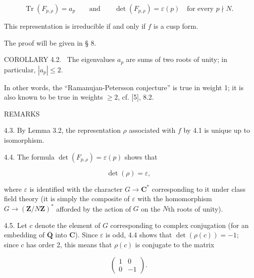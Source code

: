 \documentclass[10pt,oneside]{article}
\begin{document}
\begin{equation*}
\tag{4.1.1}
\operatorname{Tr}(F_{p,\rho})=a_p
\qquad\text{and}\qquad
\det(F_{p,\rho})=\varepsilon(p)
\quad\text{for every }p\nmid N.
\end{equation*}

This representation is irreducible if and only if \(f\) is a cusp form.\par

The proof will be given in § 8.\par

\noindent\textsc{COROLLARY 4.2.} \textemdash\ The eigenvalues \(a_p\) are sums of two roots of unity; in particular, \(|a_p|\leq 2\).\par

In other words, the “Ramanujan-Petersson conjecture” is true in weight 1; it is also known to be true in weights \(\geq 2\), cf. [5], 8.2.\par

REMARKS\par

4.3. By Lemma 3.2, the representation \(\rho\) associated with \(f\) by 4.1 is unique up to isomorphism.\par

4.4. The formula \(\det(F_{p,\rho})=\varepsilon(p)\) shows that\par

\begin{equation*}
\det(\rho)=\varepsilon,
\end{equation*}

where \(\varepsilon\) is identified with the character \(G\longrightarrow\mathbf{C}^*\) corresponding to it under class field theory (it is simply the composite of \(\varepsilon\) with the homomorphism \(G\longrightarrow(\mathbf{Z}/N\mathbf{Z})^*\) afforded by the action of \(G\) on the \(N\)th roots of unity).\par

4.5. Let \(c\) denote the element of \(G\) corresponding to complex conjugation (for an embedding of \(\overline{\mathbf{Q}}\) into \(\mathbf{C}\)). Since \(\varepsilon\) is odd, 4.4 shows that \(\det(\rho(c))=-1\); since \(c\) has order 2, this means that \(\rho(c)\) is conjugate to the matrix\par

\begin{equation*}
\begin{pmatrix}1&0\\0&-1\end{pmatrix}.
\end{equation*}
\end{document}
